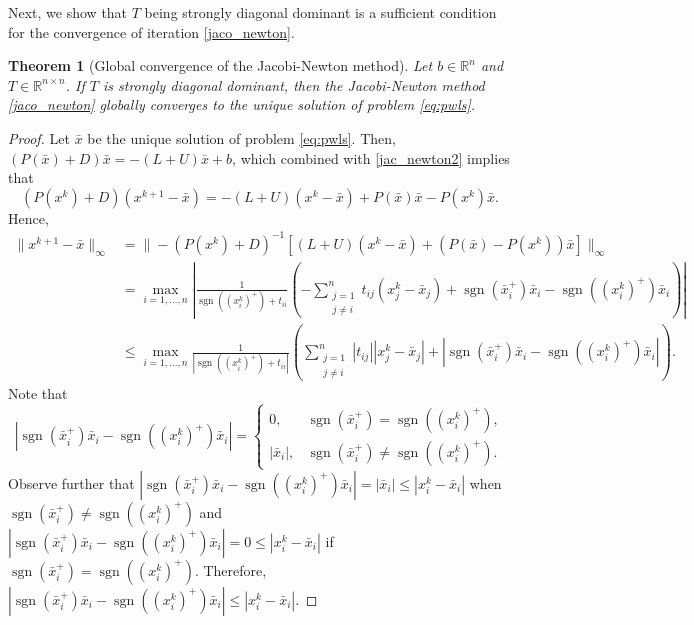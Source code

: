 \documentclass[11pt]{article}
\newtheorem{theorem}{Theorem}[section]
\DeclareMathOperator{\sgn}{sgn}
\newcommand{\R}{\mathbb R}
\begin{document}
Next, we show that $T$ being strongly diagonal dominant is a sufficient condition for the convergence of iteration \eqref{jaco_newton}.

\begin{theorem}[Global convergence of the Jacobi-Newton method]
Let $b \in \R^n$ and $T\in \R^{n\times n}$. If $T$ is strongly diagonal dominant, then the Jacobi-Newton method \eqref{jaco_newton} globally converges to the unique solution of problem \eqref{eq:pwls}.
\end{theorem}

\begin{proof} Let $\bar x$ be the unique solution of problem \eqref{eq:pwls}. Then, $(P(\bar x)+D)\bar x = -(L+U) \bar x+b$, which combined with \eqref{jac_newton2} implies that 
\[(P(x^{k})+D)(x^{k+1}-\bar x) = -(L+U)(x^k-\bar x)+ P(\bar x)\bar x - P(x^{k})\bar x.\]
Hence, 
\begin{align*}
\|x^{k+1}-\bar x\|_{\infty} &= \|-(P(x^{k})+D)^{-1}[(L+U)(x^{k}-\bar x)+(P(\bar x)- P(x^{k}))\bar x]\|_{\infty}\\
&= \max_{i=1,\dots,n}\left|\frac{1}{\sgn((x^{k}_i)^+)+t_{ii}}\left( -\sum_{\substack{j=1 \\ j \neq i}}^n t_{ij}(x^{k}_j-\bar x_j)+\sgn(\bar x_i^+)\bar x_i - \sgn((x^{k}_i)^+)\bar x_i \right)\right|\\
&\leq \max_{i=1,\dots,n}\frac{1}{|\sgn((x^{k}_i)^+)+t_{ii}|}\left( \sum_{\substack{j=1 \\ j \neq i}}^n |t_{ij}||x^{k}_j-\bar x_j|+|\sgn(\bar x_i^+)\bar x_i - \sgn((x^{k}_i)^+)\bar x_i| \right).
\end{align*}
Note that 
\[|\sgn(\bar x_i^+)\bar x_i - \sgn((x^{k}_i)^+)\bar x_i|=\left\{\begin{matrix}0,& \sgn(\bar x_i^+)=\sgn((x^{k}_i)^+),\\|\bar x_i|,&  \sgn(\bar x_i^+)\neq \sgn((x^{k}_i)^+).\end{matrix}\right.\] 
Observe further that $|\sgn(\bar x_i^+)\bar x_i - \sgn((x^{k}_i)^+)\bar x_i|=|\bar x_i|\le |x^{k}_i-\bar x_i|$ when $\sgn(\bar x_i^+)\neq \sgn((x^{k}_i)^+)$ and $|\sgn(\bar x_i^+)\bar x_i - \sgn((x^{k}_i)^+)\bar x_i|=0\le |x^{k}_i-\bar x_i|$ if $\sgn(\bar x_i^+)= \sgn((x^{k}_i)^+)$. Therefore, $|\sgn(\bar x_i^+)\bar x_i - \sgn((x^{k}_i)^+)\bar x_i|\le |x^{k}_i-\bar x_i|$. 


\end{proof}
\end{document}
